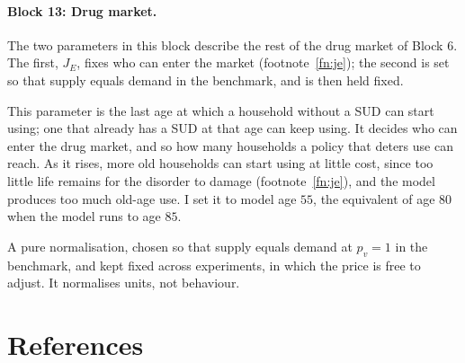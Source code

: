 \documentclass[10pt]{article}
\begin{document}
\paragraph{Block 13: Drug market.} The two parameters in this block describe the rest of the drug
market of Block 6. The first, $J_E$, fixes who can enter the market (footnote~\ref{fn:je}); the second is set so that supply equals demand in the benchmark, and is
then held fixed.
\begin{description}\setlength{\itemsep}{0.25em}\setlength{\parskip}{0em}

\item[$J_E$, the last age at which use can begin.] This parameter is the last age at which a household without a SUD can start using; one that already has a SUD at that age can keep using. It decides who can enter the drug market, and so how many households a policy that deters use can reach. As it rises, more old households can start using at little cost, since too little life remains for the disorder to damage (footnote~\ref{fn:je}), and the model produces too much old-age use. I set it to model age $55$, the equivalent of age $80$ when the model runs to age $85$.

\item[$\nu_1$, the supply shifter.] A pure normalisation, chosen so that supply
equals demand at $p_v=1$ in the benchmark, and kept fixed across experiments, in which the price is free to adjust. It normalises units, not behaviour.

\end{description}

\clearpage


\section*{References}
\end{document}
